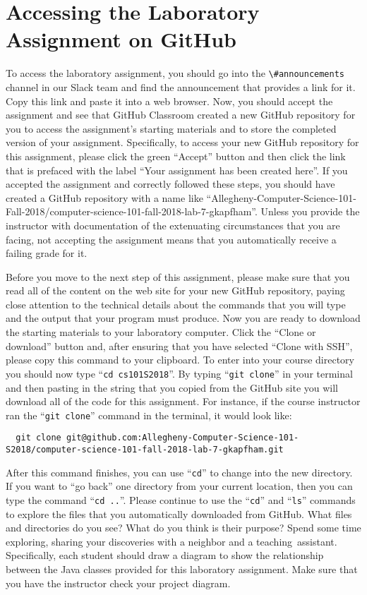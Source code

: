 \documentclass[11pt]{article}
\newcommand{\command}[1]{``\lstinline{#1}''}
\newcommand{\channel}[1]{\lstinline{#1}}
\newcommand{\step}[1]{``{#1}''}
\begin{document}
\section*{Accessing the Laboratory Assignment on GitHub}

To access the laboratory assignment, you should go into the
\channel{\#announcements} channel in our Slack team and find the announcement
that provides a link for it. Copy this link and paste it into a web browser.
Now, you should accept the assignment and see that GitHub Classroom created a
new GitHub repository for you to access the assignment's starting materials and
to store the completed version of your assignment. Specifically, to access your
new GitHub repository for this assignment, please click the green ``Accept''
button and then click the link that is prefaced with the label ``Your assignment
has been created here''. If you accepted the assignment and correctly followed
these steps, you should have created a GitHub repository with a name like
``Allegheny-Computer-Science-101-Fall-2018/computer-science-101-fall-2018-lab-7-gkapfham''.
Unless you provide the instructor with documentation of the extenuating
circumstances that you are facing, not accepting the assignment means that you
automatically receive a failing grade for it.

Before you move to the next step of this assignment, please make sure that you
read all of the content on the web site for your new GitHub repository, paying
close attention to the technical details about the commands that you will type
and the output that your program must produce. Now you are ready to download the
starting materials to your laboratory computer. Click the ``Clone or download''
button and, after ensuring that you have selected ``Clone with SSH'', please
copy this command to your clipboard. To enter into your course directory you
should now type \command{cd cs101S2018}. By typing \command{git clone} in your
terminal and then pasting in the string that you copied from the GitHub site you
will download all of the code for this assignment. For instance, if the course
instructor ran the \command{git clone} command in the terminal, it would look
like:

\begin{lstlisting}
  git clone git@github.com:Allegheny-Computer-Science-101-S2018/computer-science-101-fall-2018-lab-7-gkapfham.git
\end{lstlisting}

After this command finishes, you can use \command{cd} to change into the new
directory. If you want to \step{go back} one directory from your current
location, then you can type the command \command{cd ..}. Please continue to use
the \command{cd} and \command{ls} commands to explore the files that you
automatically downloaded from GitHub. What files and directories do you see?
What do you think is their purpose? Spend some time exploring, sharing your
discoveries with a neighbor and a \mbox{teaching assistant}. Specifically, each
student should draw a diagram to show the relationship between the Java classes
provided for this laboratory assignment. Make sure that you have the instructor
check your project diagram.
\end{document}
